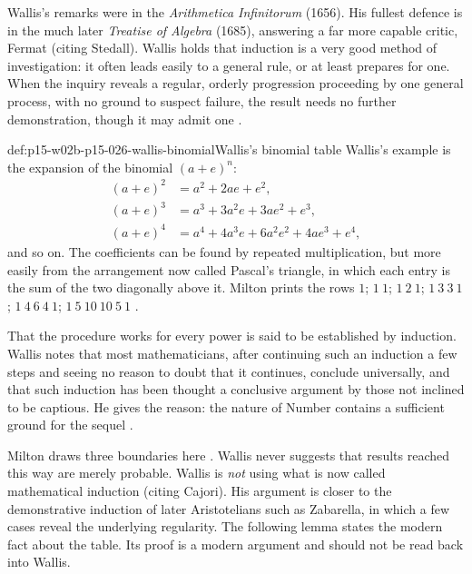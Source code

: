 Wallis's remarks were in the \emph{Arithmetica Infinitorum} (1656). His
fullest defence is in the much later \emph{Treatise of Algebra} (1685),
answering a far more capable critic, Fermat (citing Stedall). Wallis
holds that induction is a very good method of investigation: it often
leads easily to a general rule, or at least prepares for one. When the
inquiry reveals a regular, orderly progression proceeding by one general
process, with no ground to suspect failure, the result needs no further
demonstration, though it may admit one
\cite[pp.~31--32]{Milton2011InductionBeforeHume}.

\begin{hbexample}{def:p15-w02b-p15-026-wallis-binomial}{Wallis's binomial table}
Wallis's example is the expansion of the binomial $(a+e)^n$:
\begin{align*}
(a+e)^2&=a^2+2ae+e^2,\\
(a+e)^3&=a^3+3a^2e+3ae^2+e^3,\\
(a+e)^4&=a^4+4a^3e+6a^2e^2+4ae^3+e^4,
\end{align*}
and so on. The coefficients can be found by repeated multiplication, but
more easily from the arrangement now called Pascal's triangle, in which each
entry is the sum of the two diagonally above it. Milton prints the rows
$1$; $1\ 1$; $1\ 2\ 1$; $1\ 3\ 3\ 1$; $1\ 4\ 6\ 4\ 1$;
$1\ 5\ 10\ 10\ 5\ 1$ \cite[p.~32]{Milton2011InductionBeforeHume}.

That the procedure works for every power is said to be established by
induction. Wallis notes that most mathematicians, after continuing such an
induction a few steps and seeing no reason to doubt that it continues,
conclude universally, and that such induction has been thought a
conclusive argument by those not inclined to be captious. He gives the
reason: the nature of Number contains a sufficient ground for the sequel
\cite[p.~32]{Milton2011InductionBeforeHume}.
\end{hbexample}

Milton draws three boundaries here \cite[p.~32]{Milton2011InductionBeforeHume}.
Wallis never suggests that results reached this way are merely probable.
Wallis is \emph{not} using what is now called mathematical induction
(citing Cajori). His argument is closer to the demonstrative induction of
later Aristotelians such as Zabarella, in which a few cases reveal the
underlying regularity. The following lemma states the modern fact about the
table. Its proof is a modern argument and should not be read back into
Wallis.

